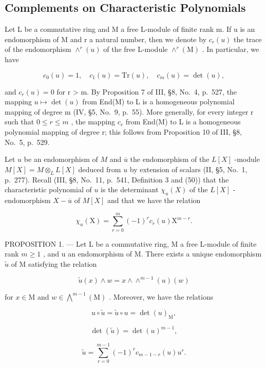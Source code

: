 \subsection{Complements on Characteristic Polynomials}

Let L be a commutative ring and M a free L-module of finite rank m. If u is an endomorphism of M and r a natural number, then we denote by \(c_{r}(u)\) the trace of the endomorphism \(\wedge^{r}(u)\) of the free L-module \(\wedge^{r}(\mathrm{M})\) . In particular, we have

\[
c _ {0} (u) = 1, \quad c _ {1} (u) = \mathrm{Tr} (u), \quad c _ {m} (u) = \det (u),\tag{1}
\]

and \(c_{r}(u) = 0\) for r \textgreater{} m. By Proposition 7 of III, §8, No.~4, p.~527, the mapping \(u \mapsto \det(u)\) from End(M) to L is a homogeneous polynomial mapping of degree m (IV, §5, No.~9, p.~55). More generally, for every integer r such that \(0 \leqslant r \leqslant m\) , the mapping \(c_{r}\) from End(M) to L is a homogeneous polynomial mapping of degree r; this follows from Proposition 10 of III, §8, No.~5, p.~529.

Let \(u\) be an endomorphism of \(M\) and \(\overline{u}\) the endomorphism of the \(L[X]\) -module \(M[X] = M \otimes_{L} L[X]\) deduced from \(u\) by extension of scalars (II, §5, No.~1, p.~277). Recall (III, §8, No.~11, p.~541, Definition 3 and (50)) that the characteristic polynomial of \(u\) is the determinant \(\chi_u(X)\) of the \(L[X]\) -endomorphism \(X - \overline{u}\) of \(M[X]\) and that we have the relation

\[
\chi_ {u} (\mathrm{X}) = \sum_ {r = 0} ^ {m} (- 1) ^ {r} c _ {r} (u) \mathrm{X} ^ {m - r}.\tag{2}
\]

PROPOSITION 1. --- Let L be a commutative ring, M a free L-module of finite rank \(m \geqslant 1\) , and u an endomorphism of M. There exists a unique endomorphism \(\widetilde{u}\) of M satisfying the relation

\[
\widetilde {u} (x) \wedge w = x \wedge \wedge^ {m - 1} (u) (w)\tag{3}
\]

for \(x\in \mathrm{M}\) and \(w\in \bigwedge^{m - 1}(\mathrm{M})\) . Moreover, we have the relations

\[
u \circ \widetilde {u} = \widetilde {u} \circ u = \det (u) _ {\mathrm{M}},\tag{4}
\]

\[
\det (\widetilde {u}) = \det (u) ^ {m - 1},\tag{5}
\]

\[
\widetilde {u} = \sum_ {r = 0} ^ {m - 1} (- 1) ^ {r} c _ {m - 1 - r} (u) u ^ {r}.\tag{6}
\]

